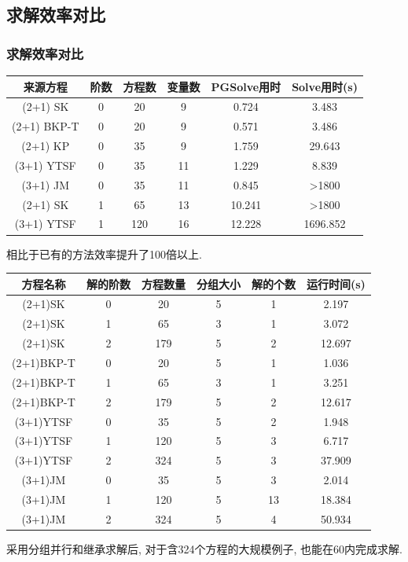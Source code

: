\documentclass[handout]{beamer}
\newcommand{\red}[1]{{\color{red}#1}}
\begin{document}
\subsection{求解效率对比}
\begin{frame}
\frametitle{求解效率对比}
\begin{adjustbox}{max width=\textwidth}
\centering
\renewcommand{\arraystretch}{1.3}
\begin{tabular}{cccccc}
\hline
来源方程 & 阶数 & 方程数 & 变量数 & PGSolve用时 & Solve用时(s) \\
\hline
(2+1) SK & 0 & 20 & 9 & 0.724 & 3.483 \\
(2+1) BKP-T & 0 & 20 & 9 & 0.571 & 3.486 \\
(2+1) KP & 0 & 35 & 9 & 1.759 & 29.643 \\
(3+1) YTSF & 0 & 35 & 11 & 1.229 & 8.839 \\
(3+1) JM & 0 & 35 & 11 & 0.845 & >1800 \\
(2+1) SK & 1 & 65 & 13 & 10.241 & >1800 \\
(3+1) YTSF & 1 & 120 & 16 & \red{12.228} & \red{1696.852} \\
\hline
\end{tabular}
\end{adjustbox}

\vspace{1em}

相比于已有的方法效率提升了100倍以上. 

\end{frame}

\begin{frame}

\begin{adjustbox}{max width=\textwidth}
\renewcommand{\arraystretch}{1.3}
\begin{tabular}{cccccc}
\hline
方程名称    & 解的阶数 & 方程数量 & 分组大小 & 解的个数 & 运行时间(s) \\ 
\hline 
(2+1)SK & 0 & 20 & 5 & 1 & 2.197 \\
(2+1)SK & 1 & 65 & 3 & 1 & 3.072 \\
(2+1)SK & 2 & 179 & 5 & 2 & 12.697 \\
(2+1)BKP-T & 0 & 20 & 5 & 1 & 1.036 \\
(2+1)BKP-T & 1 & 65 & 3 & 1 & 3.251 \\
(2+1)BKP-T & 2 & 179 & 5 & 2 & 12.617 \\
(3+1)YTSF & 0 & 35 & 5 & 2 & 1.948 \\
(3+1)YTSF & 1 & 120 & 5 & 3 & 6.717 \\
(3+1)YTSF & 2 & \red{324} & 5 & 3 & \red{37.909} \\
(3+1)JM & 0 & 35 & 5 & 3 & 2.014 \\
(3+1)JM & 1 & 120 & 5 & 13 & 18.384 \\
(3+1)JM & 2 & \red{324} & 5 & 4 & \red{50.934} \\
\hline 
\end{tabular}
\end{adjustbox}
采用分组并行和继承求解后, 对于含324个方程的大规模例子, 也能在60内完成求解.
\end{frame}
\end{document}
